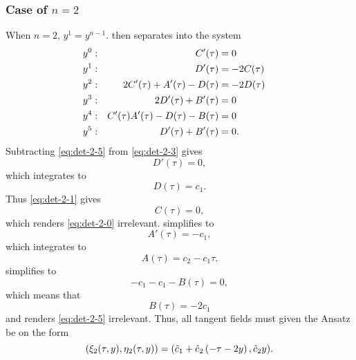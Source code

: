 \subsubsection{Case of \texorpdfstring{\(n=2\)}{n is 2}}

When \(n=2\), \(y^1 = y^{n-1}\).
 then separates into the system
\begin{subequations}
  \begin{flalign}
      y^0:  && C'(\tau) &= 0                               &&\FlLabel{eq:det-2-0}\\
      y^1:  && D'(\tau) &= -2C(\tau)                       &&\FlLabel{eq:det-2-1}\\
      y^2:  && 2C'(\tau) + A'(\tau) - D(\tau) &= -2D(\tau) &&\FlLabel{eq:det-2-2}\\
      y^3:  && 2D'(\tau) + B'(\tau) &= 0                   &&\FlLabel{eq:det-2-3}\\
      y^4:  && C'(\tau) A'(\tau) - D(\tau) - B(\tau) &= 0  &&\FlLabel{eq:det-2-4}\\
      y^5:  && D'(\tau) + B'(\tau) &= 0.                   &&\FlLabel{eq:det-2-5}
  \end{flalign}
\end{subequations}
Subtracting \cref{eq:det-2-5} from \cref{eq:det-2-3} gives
\begin{equation}
  D'(\tau) = 0,
\end{equation}
which integrates to
\begin{equation}
  D(\tau) = c_1.
\end{equation}
Thus \cref{eq:det-2-1} gives
\begin{equation}
  C(\tau) = 0,
\end{equation}
which renders \cref{eq:det-2-0} irrelevant.
 simplifies to
\begin{equation}
  A'(\tau) = - c_1,
\end{equation}
which integrates to
\begin{equation}
  A(\tau) = c_2 - c_1 \tau.
\end{equation}
 simplifies to
\begin{equation}
  - c_1 - c_1 - B(\tau) = 0,
\end{equation}
which means that
\begin{equation}
  B(\tau) = -2 c_1
\end{equation}
and renders \cref{eq:det-2-5} irrelevant.
Thus, all tangent fields must given the Ansatz be on the form
\begin{equation} \label{eq:hill-tangent-field-2}
  \pqty{\xi_2(\tau,y),\eta_2(\tau,y)} = 
  \pqty{\tilde{c}_1 + \tilde{c}_2 \left( - \tau -2 y \right), \tilde{c}_2 y}.
\end{equation}


